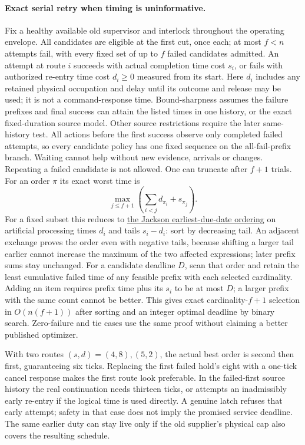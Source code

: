 \documentclass{article}
\begin{document}
\paragraph{Exact serial retry when timing is uninformative.}
Fix a healthy available old supervisor and interlock throughout the operating envelope. All candidates are eligible at the first cut, once each; at most $f<n$ attempts fail, with every fixed set of up to $f$ failed candidates admitted. An attempt at route $i$ succeeds with actual completion time cost $s_i$, or fails with authorized re-entry time cost $d_i\ge0$ measured from its start. Here $d_i$ includes any retained physical occupation and delay until its outcome and release may be used; it is not a command-response time. Bound-sharpness assumes the failure prefixes and final success can attain the listed times in one history, or the exact fixed-duration source model. Other source restrictions require the later same-history test.
All actions before the first success observe only completed failed attempts, so every candidate policy has one fixed sequence on the all-fail-prefix branch. Waiting cannot help without new evidence, arrivals or changes. Repeating a failed candidate is not allowed. One can truncate after $f+1$ trials. For an order $\pi$ its exact worst time is
\[
  \max_{j\le f+1}\left(\sum_{i<j}d_{\pi_i}+s_{\pi_j}\right).
\]
For a fixed subset this reduces to \href{https://people.csail.mit.edu/karger/Papers/scheduling.pdf}{the Jackson earliest-due-date ordering} on artificial processing times $d_i$ and tails $s_i-d_i$: sort by decreasing tail. An adjacent exchange proves the order even with negative tails, because shifting a larger tail earlier cannot increase the maximum of the two affected expressions; later prefix sums stay unchanged. For a candidate deadline $D$, scan that order and retain the least cumulative failed time of any feasible prefix with each selected cardinality. Adding an item requires prefix time plus its $s_i$ to be at most $D$; a larger prefix with the same count cannot be better. This gives exact cardinality-$f+1$ selection in $O(n(f+1))$ after sorting and an integer optimal deadline by binary search. Zero-failure and tie cases use the same proof without claiming a better published optimizer.

With two routes $(s,d)=(4,8),(5,2)$, the actual best order is second then first, guaranteeing six ticks. Replacing the first failed hold's eight with a one-tick cancel response makes the first route look preferable. In the failed-first source history the real continuation needs thirteen ticks, or attempts an inadmissibly early re-entry if the logical time is used directly. A genuine latch refuses that early attempt; safety in that case does not imply the promised service deadline. The same earlier duty can stay live only if the old supplier's physical cap also covers the resulting schedule.
\end{document}
